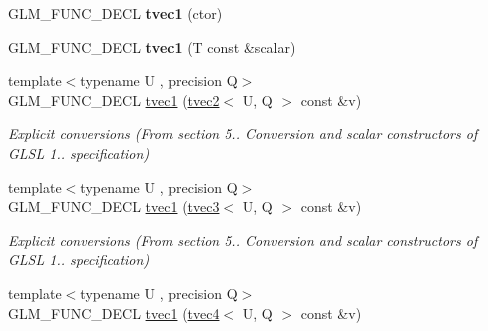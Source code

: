 \begin{DoxyCompactItemize}
\item 
\hypertarget{structglm_1_1tvec1_a61d1e0344299ba644e970e587bb62871}{G\-L\-M\-\_\-\-F\-U\-N\-C\-\_\-\-D\-E\-C\-L {\bfseries tvec1} (ctor)}\label{structglm_1_1tvec1_a61d1e0344299ba644e970e587bb62871}

\item 
\hypertarget{structglm_1_1tvec1_a5cec78d02ef478dbc60a79e531519246}{G\-L\-M\-\_\-\-F\-U\-N\-C\-\_\-\-D\-E\-C\-L {\bfseries tvec1} (T const \&scalar)}\label{structglm_1_1tvec1_a5cec78d02ef478dbc60a79e531519246}

\item 
\hypertarget{structglm_1_1tvec1_a8851910a8c3a76c5af513069af86c5f9}{{\footnotesize template$<$typename U , precision Q$>$ }\\G\-L\-M\-\_\-\-F\-U\-N\-C\-\_\-\-D\-E\-C\-L \hyperlink{structglm_1_1tvec1_a8851910a8c3a76c5af513069af86c5f9}{tvec1} (\hyperlink{structglm_1_1tvec2}{tvec2}$<$ U, Q $>$ const \&v)}\label{structglm_1_1tvec1_a8851910a8c3a76c5af513069af86c5f9}

\begin{DoxyCompactList}\small\item\em Explicit conversions (From section 5.. Conversion and scalar constructors of G\-L\-S\-L 1.. specification) \end{DoxyCompactList}\item 
\hypertarget{structglm_1_1tvec1_a680bd254cdc4777fc964b2bc96be2429}{{\footnotesize template$<$typename U , precision Q$>$ }\\G\-L\-M\-\_\-\-F\-U\-N\-C\-\_\-\-D\-E\-C\-L \hyperlink{structglm_1_1tvec1_a680bd254cdc4777fc964b2bc96be2429}{tvec1} (\hyperlink{structglm_1_1tvec3}{tvec3}$<$ U, Q $>$ const \&v)}\label{structglm_1_1tvec1_a680bd254cdc4777fc964b2bc96be2429}

\begin{DoxyCompactList}\small\item\em Explicit conversions (From section 5.. Conversion and scalar constructors of G\-L\-S\-L 1.. specification) \end{DoxyCompactList}\item 
\hypertarget{structglm_1_1tvec1_ab987fb10b4d96f02fe57a8f27fe009b3}{{\footnotesize template$<$typename U , precision Q$>$ }\\G\-L\-M\-\_\-\-F\-U\-N\-C\-\_\-\-D\-E\-C\-L \hyperlink{structglm_1_1tvec1_ab987fb10b4d96f02fe57a8f27fe009b3}{tvec1} (\hyperlink{structglm_1_1tvec4}{tvec4}$<$ U, Q $>$ const \&v)}\label{structglm_1_1tvec1_ab987fb10b4d96f02fe57a8f27fe009b3}


\end{DoxyCompactItemize}
